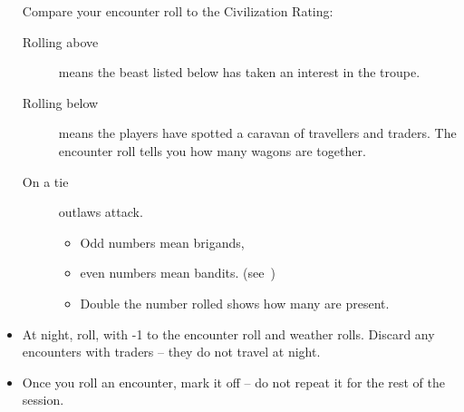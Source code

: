 \begin{multicols}{2}
\begin{itemize}
  Compare your encounter roll to the Civilization Rating:
  \begin{description}
    \item[Rolling above]
    means the beast listed below has taken an interest in the troupe.
    \item[Rolling below]
    means the players have spotted a caravan of travellers and traders.
    The encounter roll tells you how many wagons are together.
    \item[On a tie]
    outlaws attack.
    \begin{itemize}
      \item
      Odd numbers mean brigands,
      \item
      even numbers mean bandits.
      (see~)
      \item
      Double the number rolled shows how many are present.
    \end{itemize}
  \end{description}
  \item
  At night, roll, with -1 to the encounter roll and weather rolls.
  Discard any encounters with traders -- they do not travel at night.
  \item
  Once you roll an encounter, mark it off -- do not repeat it for the rest of the session.
\end{itemize}

\end{multicols}

\pagebreak

